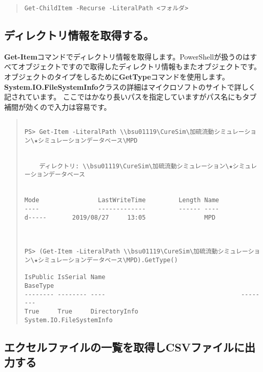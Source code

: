 \documentclass[dvipdfmx]{jsarticle}
\begin{document}
\begin{quote}
\begin{verbatim}
Get-ChildItem -Recurse -LiteralPath <フォルダ>
\end{verbatim}
\end{quote}


\subsection{ディレクトリ情報を取得する。}

\textbf{Get-Item}コマンドでディレクトリ情報を取得します。PowerShellが扱うのはすべてオブジェクトですので取得したディレクトリ情報もまたオブジェクトです。オブジェクトのタイプをしるために\textbf{GetType}コマンドを使用します。
\textbf{System.IO.FileSystemInfo}クラスの詳細はマイクロソフトのサイトで詳しく記されています。
ここではかなり長いパスを指定していますがパス名にもタブ補間が効くので入力は容易です。

\begin{quote}
\begin{verbatim}

PS> Get-Item -LiteralPath \\bsu01119\CureSim\加硫流動シミュレーション\★シミュレーションデータベース\MPD


    ディレクトリ: \\bsu01119\CureSim\加硫流動シミュレーション\★シミュレーションデータベース


Mode                LastWriteTime         Length Name                                                      
----                -------------         ------ ----                                                      
d-----       2019/08/27     13:05                MPD                                                       



PS> (Get-Item -LiteralPath \\bsu01119\CureSim\加硫流動シミュレーション\★シミュレーションデータベース\MPD).GetType()

IsPublic IsSerial Name                                     BaseType                                        
-------- -------- ----                                     --------                                        
True     True     DirectoryInfo                            System.IO.FileSystemInfo                        
\end{verbatim}
\end{quote}


\subsection{エクセルファイルの一覧を取得しCSVファイルに出力する}
\end{document}
